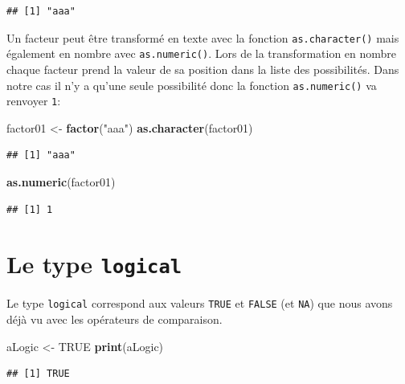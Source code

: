 \documentclass[
]{book}
\newenvironment{Shaded}{\begin{snugshade}}{\end{snugshade}}
\newcommand{\KeywordTok}[1]{\textcolor[rgb]{0.13,0.29,0.53}{\textbf{#1}}}
\newcommand{\NormalTok}[1]{#1}
\newcommand{\OtherTok}[1]{\textcolor[rgb]{0.56,0.35,0.01}{#1}}
\newcommand{\StringTok}[1]{\textcolor[rgb]{0.31,0.60,0.02}{#1}}
\begin{document}
\begin{verbatim}
## [1] "aaa"
\end{verbatim}

Un facteur peut être transformé en texte avec la fonction \texttt{as.character()} mais également en nombre avec \texttt{as.numeric()}. Lors de la transformation en nombre chaque facteur prend la valeur de sa position dans la liste des possibilités. Dans notre cas il n'y a qu'une seule possibilité donc la fonction \texttt{as.numeric()} va renvoyer \texttt{1}:

\begin{Shaded}
\begin{Highlighting}[]
\NormalTok{factor01 <-}\StringTok{ }\KeywordTok{factor}\NormalTok{(}\StringTok{"aaa"}\NormalTok{)}
\KeywordTok{as.character}\NormalTok{(factor01)}
\end{Highlighting}
\end{Shaded}

\begin{verbatim}
## [1] "aaa"
\end{verbatim}

\begin{Shaded}
\begin{Highlighting}[]
\KeywordTok{as.numeric}\NormalTok{(factor01)}
\end{Highlighting}
\end{Shaded}

\begin{verbatim}
## [1] 1
\end{verbatim}

\hypertarget{l013logi}{%
\section{\texorpdfstring{Le type \texttt{logical}}{Le type logical}}\label{l013logi}}

Le type \texttt{logical} correspond aux valeurs \texttt{TRUE} et \texttt{FALSE} (et \texttt{NA}) que nous avons déjà vu avec les opérateurs de comparaison.

\begin{Shaded}
\begin{Highlighting}[]
\NormalTok{aLogic <-}\StringTok{ }\OtherTok{TRUE}
\KeywordTok{print}\NormalTok{(aLogic)}
\end{Highlighting}
\end{Shaded}

\begin{verbatim}
## [1] TRUE
\end{verbatim}
\end{document}
